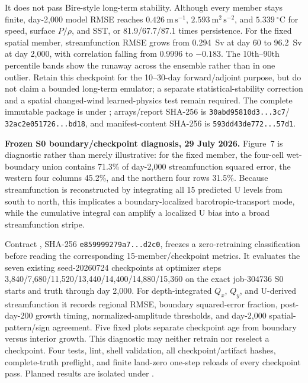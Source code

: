 \documentclass[11pt]{article}
\begin{document}
It does not pass Bire-style long-term stability.  Although every member stays
finite, day-2,000 model RMSE reaches \(0.426~\mathrm{m\,s^{-1}}\),
\(2.593~\mathrm{m^2\,s^{-2}}\), and \(5.339~{}^\circ\mathrm{C}\) for
speed, surface \(P/\rho\), and SST, or 81.9/67.7/87.1 times persistence.
For the fixed spatial member, streamfunction RMSE grows from 0.294~Sv at
day 60 to 96.2~Sv at day 2,000, with correlation falling from 0.9996 to
\(-0.183\).  The 10th--90th percentile bands show the runaway across the
ensemble rather than in one outlier.  Retain this checkpoint for the
10--30-day forward/adjoint purpose, but do not claim a bounded long-term
emulator; a separate statistical-stability correction and a spatial
changed-wind learned-physics test remain required.  The complete immutable
package is under
; arrays/report
SHA-256 is \texttt{30abd95810d3...3c7}/
\texttt{32ac2e051726...bd18}, and manifest-content SHA-256 is
\texttt{593dd43de772...57d1}.

\textbf{Frozen S0 boundary/checkpoint diagnosis, 29 July 2026.}  Figure~7
is diagnostic rather than merely illustrative: for the fixed member, the
four-cell wet-boundary union contains 71.3\% of day-2,000 streamfunction
squared error, the western four columns 45.2\%, and the northern four rows
31.5\%.  Because streamfunction is reconstructed by integrating all 15
predicted U levels from south to north, this implicates a boundary-localized
barotropic-transport mode, while the cumulative integral can amplify a
localized U bias into a broad streamfunction stripe.

Contract , SHA-256
\texttt{e859999279a7...d2c0}, freezes a zero-retraining classification before
reading the corresponding 15-member/checkpoint metrics.  It evaluates the
seven existing seed-20260724 checkpoints at optimizer steps
3,840/7,680/11,520/13,440/14,400/14,880/15,360 on the exact job-304736 S0
starts and truth through day 2,000.  For depth-integrated \(Q_x\), \(Q_y\),
and U-derived streamfunction it records regional RMSE, boundary squared-error
fraction, post-day-200 growth timing, normalized-amplitude thresholds, and
day-2,000 spatial-pattern/sign agreement.  Five fixed plots separate
checkpoint age from boundary versus interior growth.  This diagnostic may
neither retrain nor reselect a checkpoint.  Four tests, lint, shell
validation, all checkpoint/artifact hashes, complete-truth preflight, and
finite land-zero one-step reloads of every checkpoint pass.  Planned results
are isolated under
.
\end{document}
